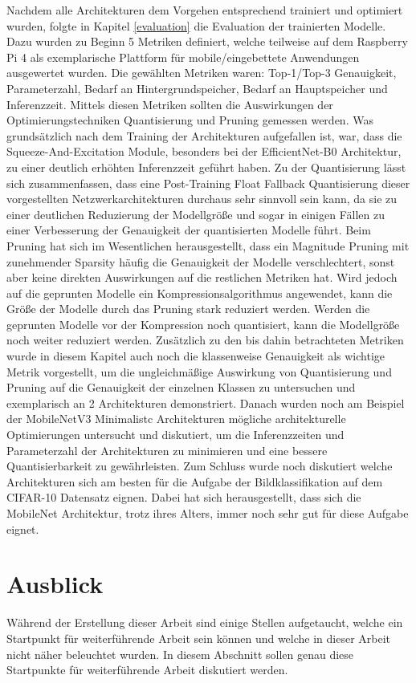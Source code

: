 Nachdem alle Architekturen dem Vorgehen entsprechend trainiert und optimiert wurden, folgte in Kapitel \ref{evaluation} die Evaluation der trainierten Modelle. Dazu wurden zu Beginn 5 Metriken definiert, welche teilweise auf dem Raspberry Pi 4 als exemplarische Plattform für mobile/eingebettete Anwendungen ausgewertet wurden. Die gewählten Metriken waren: Top-1/Top-3 Genauigkeit, Parameterzahl, Bedarf an Hintergrundspeicher, Bedarf an Hauptspeicher und Inferenzzeit. Mittels diesen Metriken sollten die Auswirkungen der Optimierungstechniken Quantisierung und Pruning gemessen werden. Was grundsätzlich nach dem Training der Architekturen aufgefallen ist, war, dass die Squeeze-And-Excitation Module, besonders bei der EfficientNet-B0 Architektur, zu einer deutlich erhöhten Inferenzzeit geführt haben. Zu der Quantisierung lässt sich zusammenfassen, dass eine Post-Training Float Fallback Quantisierung dieser vorgestellten Netzwerkarchitekturen durchaus sehr sinnvoll sein kann, da sie zu einer deutlichen Reduzierung der Modellgröße und sogar in einigen Fällen zu einer Verbesserung der Genauigkeit der quantisierten Modelle führt. Beim Pruning hat sich im Wesentlichen herausgestellt, dass ein Magnitude Pruning mit zunehmender Sparsity häufig die Genauigkeit der Modelle verschlechtert, sonst aber keine direkten Auswirkungen auf die restlichen Metriken hat. Wird jedoch auf die geprunten Modelle ein Kompressionsalgorithmus angewendet, kann die Größe der Modelle durch das Pruning stark reduziert werden. Werden die geprunten Modelle vor der Kompression noch quantisiert, kann die Modellgröße noch weiter reduziert werden. Zusätzlich zu den bis dahin betrachteten Metriken wurde in diesem Kapitel auch noch die klassenweise Genauigkeit als wichtige Metrik vorgestellt, um die ungleichmäßige Auswirkung von Quantisierung und Pruning auf die Genauigkeit der einzelnen Klassen zu untersuchen und exemplarisch an 2 Architekturen demonstriert. Danach wurden noch am Beispiel der MobileNetV3 Minimalistc Architekturen mögliche architekturelle Optimierungen untersucht und diskutiert, um die Inferenzzeiten und Parameterzahl der Architekturen zu minimieren und eine bessere Quantisierbarkeit zu gewährleisten. Zum Schluss wurde noch diskutiert welche Architekturen sich am besten für die Aufgabe der Bildklassifikation auf dem CIFAR-10 Datensatz eignen. Dabei hat sich herausgestellt, dass sich die MobileNet Architektur, trotz ihres Alters, immer noch sehr gut für diese Aufgabe eignet.



\section{Ausblick}
Während der Erstellung dieser Arbeit sind einige Stellen aufgetaucht, welche ein Startpunkt für weiterführende Arbeit sein können und welche in dieser Arbeit nicht näher beleuchtet wurden. In diesem Abschnitt sollen genau diese Startpunkte für weiterführende Arbeit diskutiert werden.

